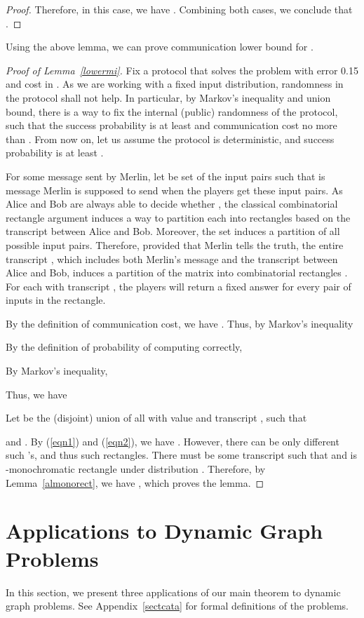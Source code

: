 \documentclass[11pt]{article}
\begin{document}
{\begin{proof}
Therefore, in this case, we have . Combining both cases, we conclude that . 
\end{proof}

Using the above lemma, we can prove communication lower bound for \mi{}.

\begin{proof}[Proof of Lemma~\ref{lowermi}]
Fix a protocol that solves the \mi{} problem with error 0.15 and cost  in \mm{}. As we are working with a fixed input distribution, randomness in the protocol shall not help. In particular, by Markov's inequality and union bound, there is a way to fix the internal (public) randomness of the protocol, such that the success probability is at least  and communication cost no more than . From now on, let us assume the protocol is deterministic, and success probability is at least . 

For some message  sent by Merlin, let  be set of the input pairs  such that  is message Merlin is supposed to send when the players get these input pairs. As Alice and Bob are always able to decide whether , the classical combinatorial rectangle argument induces a way to partition each  into rectangles based on the transcript between Alice and Bob. Moreover, the set  induces a partition of all possible input pairs. Therefore, provided that Merlin tells the truth, the entire transcript , which includes both Merlin's message and the transcript between Alice and Bob, induces a partition of the matrix  into combinatorial rectangles . For each  with transcript , the players will return a fixed answer  for every pair of inputs in the rectangle. 

By the definition of communication cost, we have . Thus, by Markov's inequality


By the definition of probability of computing  correctly, 

By Markov's inequality, 


Thus, we have


Let  be the (disjoint) union of all  with value  and transcript , such that 

and . By (\ref{eqn1}) and (\ref{eqn2}), we have . However, there can be only  different such 's, and thus  such rectangles. There must be some transcript  such that  and  is -monochromatic rectangle under distribution . Therefore, by Lemma~\ref{almonorect}, we have , which proves the lemma. 

\end{proof}

\section{Applications to Dynamic Graph Problems}\label{sectapp}
In this section, we present three applications of our main theorem to dynamic graph problems. See Appendix~\ref{sectcata} for formal definitions of the problems.

}
\end{document}
